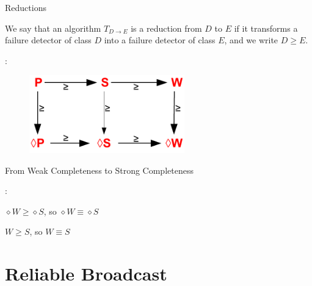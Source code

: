 \begin{frame}{Reductions}
	
\begin{definition}[Reduction]
We say that an algorithm $T_{D \rightarrow E}$ is a \alert{reduction} from $D$ to $E$ if it transforms 
a failure detector of class $D$ into a failure detector of class $E$, and we write $D \geq E$.
\end{definition}

:
\begin{figure}
\includegraphics[width=0.6\textwidth]{figs/07/reductions}
\end{figure}

\end{frame}

\begin{frame}{From Weak Completeness to Strong Completeness}

\begin{Procedure}
\caption{Reduction from class $D$ to class $E$, executed by process $p_i$}	
	
\BlankLine
{}
\BlankLine
{}
\end{Procedure}	

:
\BI
\item $\diamond W \geq \diamond S$, so $\diamond W \equiv \diamond S$
\item $W \geq S$, so $W \equiv S$
\EI

\end{frame}


\section{Reliable Broadcast}

